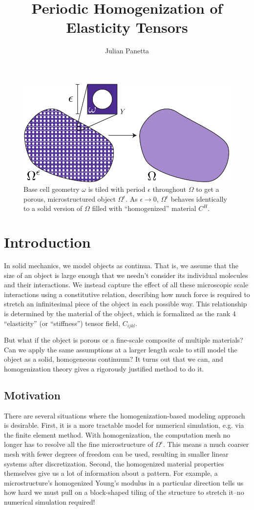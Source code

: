 \documentclass[10pt]{article}
\title{Periodic Homogenization of Elasticity Tensors}
\author{Julian Panetta}
\providecommand{\e}{\epsilon}
\begin{document}
\maketitle
    \begin{figure}[H]
        \centering
        \includegraphics[width=.75\textwidth]{Images/homogenize.pdf}
        \caption{Base cell geometry $\omega$ is tiled with period $\epsilon$
            throughout $\Omega$ to get a porous, microstructured object
        $\Omega^\epsilon$. As $\epsilon \to 0$, $\Omega^\epsilon$ behaves
        identically to a solid version of $\Omega$ filled with
        ``homogenized'' material $C^H$.}
        \label{fig:homogenization}
    \end{figure}
\section{Introduction}
In solid mechanics, we model objects as continua. That is,
we assume that the size of an object is large enough that we needn't consider
its individual molecules and their interactions. We instead capture the
effect of all these microscopic scale interactions using a constitutive
relation, describing how much force is required to stretch an infinitesimal
piece of the object in each possible way. This relationship is determined by the
material of the object, which is formalized as the rank 4 ``elasticity'' (or
``stiffness'') tensor field, $C_{ijkl}$.

But what if the object is porous or a fine-scale composite of
multiple materials? Can we apply the same assumptions at a larger length scale
to still model the object as a solid, homogeneous continuum? It turns out that
we can, and homogenization theory gives a rigorously justified method to do
it.

\subsection{Motivation}
There are several situations where the homogenization-based modeling approach
is desirable. First, it is a more tractable model for numerical simulation,
e.g. via the finite element method. With homogenization, the computation mesh
no longer has to resolve all the fine microstructure of $\Omega^\e$. This means
a much coarser mesh with fewer degrees of freedom can be used, resulting in
smaller linear systems after discretization. Second, the homogenized material
properties themselves give us a lot of information about a pattern. For example,
a microstructure's homogenized Young's modulus in a particular direction tells
us how hard we must pull on a block-shaped tiling of the structure to stretch
it--no numerical simulation required!
\end{document}
